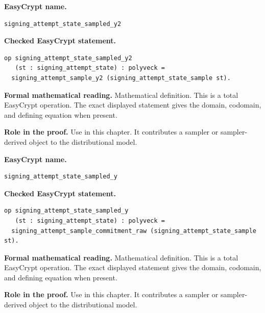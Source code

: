 \begin{formaldefinition}
\noindent\textbf{EasyCrypt name.}
\begin{lstlisting}[language=EasyCrypt,basicstyle=\ttfamily\scriptsize]
signing_attempt_state_sampled_y2
\end{lstlisting}
\noindent\textbf{Checked EasyCrypt statement.}
\begin{lstlisting}[language=EasyCrypt,basicstyle=\ttfamily\scriptsize]
op signing_attempt_state_sampled_y2
   (st : signing_attempt_state) : polyveck =
  signing_attempt_sample_y2 (signing_attempt_state_sample st).
\end{lstlisting}
\noindent\textbf{Formal mathematical reading.}
Mathematical definition. This is a total EasyCrypt operation.  The exact displayed statement gives the domain, codomain, and defining equation when present.

\noindent\textbf{Role in the proof.}
Use in this chapter. It contributes a sampler or sampler-derived object to the distributional model.

\end{formaldefinition}

\begin{formaldefinition}
\noindent\textbf{EasyCrypt name.}
\begin{lstlisting}[language=EasyCrypt,basicstyle=\ttfamily\scriptsize]
signing_attempt_state_sampled_y
\end{lstlisting}
\noindent\textbf{Checked EasyCrypt statement.}
\begin{lstlisting}[language=EasyCrypt,basicstyle=\ttfamily\scriptsize]
op signing_attempt_state_sampled_y
   (st : signing_attempt_state) : polyveck =
  signing_attempt_sample_commitment_raw (signing_attempt_state_sample st).
\end{lstlisting}
\noindent\textbf{Formal mathematical reading.}
Mathematical definition. This is a total EasyCrypt operation.  The exact displayed statement gives the domain, codomain, and defining equation when present.

\noindent\textbf{Role in the proof.}
Use in this chapter. It contributes a sampler or sampler-derived object to the distributional model.

\end{formaldefinition}

